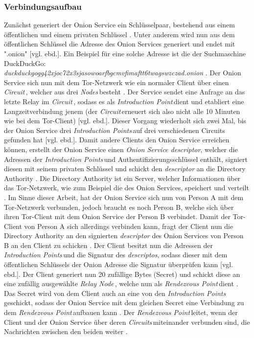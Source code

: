 \documentclass[a4paper,ngerman, headheight=28pt,12pt]{scrartcl}
\newcommand{\vcite}[1]{\cite[vgl.][]{#1}}
\newcommand{\vebd}{[vgl. ebd.]}
\newcommand{\relayn}{\textit{Relay Node\,}}
\newcommand{\nodes}{\textit{Nodes\,}}
\newcommand{\circuit}{\textit{Circuit\,}}
\newcommand{\circuits}{\textit{Circuits\,}}
\newcommand{\introp}{\textit{Introduction Point\,}}
\newcommand{\introps}{\textit{Introduction Points\,}}
\newcommand{\renp}{\textit{Rendezvous Point\,}}
\begin{document}
\subsubsection{Verbindungsaufbau}
Zunächst generiert der Onion Service ein Schlüsselpaar, bestehend aus einem öffentlichen und einem privaten Schlüssel \vcite{GeeksOnionService}. Unter anderem wird nun aus dem öffentlichen Schlüssel die Adresse des Onion Services generiert und endet mit ".onion" \vebd. Ein Beispiel für eine solche Adresse ist die der Suchmaschine DuckDuckGo: \\
\textit{duckduckgogg42xjoc72x3sjasowoarfbgcmvfimaftt6twagswzczad.onion} \vcite{DuckDuckGoLink}.
Der Onion Service sich nun mit dem Tor-Netzwerk wie ein normaler Client über einen \circuit, welcher aus drei \nodes besteht \vcite{TorOnionService}. Der Service sendet eine Anfrage an das letzte Relay im \circuit, sodass es als \introp dient und etabliert eine Langzeitverbindung jenem (der \circuit erneuert sich also nicht alle 10 Minuten wie bei dem Tor-Client) \vebd. Dieser Vorgang wiederholt sich zwei Mal, bis der Onion Service drei \introps auf drei verschiedenen Circuits gefunden hat \vebd. Damit andere Clients den Onion Service erreichen können, erstellt der Onion Service einen \textit{Onion Service descriptor}, welcher die Adressen der \introps und Authentifizierungsschlüssel enthält, signiert diesen mit seinem privaten Schlüssel und schickt den \textit{descriptor} an die Directory Authority \vcite{TorSpecDerivingKeys, TorSpecDirectoryInf}. Die Directory Authority ist ein Server, welcher Informationen über das Tor-Netzwerk, wie zum Beispiel die des Onion Services, speichert und verteilt \vcite{TorDirectoryAuthority}. Im Sinne dieser Arbeit, hat der Onion Service sich nun von Person A mit dem Tor-Netzwerk verbunden, jedoch braucht es noch Person B, welche sich über ihren Tor-Client mit dem Onion Service der Person B verbindet. Damit der Tor-Client von Person A sich allerdings verbinden kann, fragt der Client nun die Directory Authority an den signierten \textit{descriptor} des Onion Services von Person B an den Client zu schicken \vcite{TorStructure}. Der Client besitzt nun die Adressen der \introps und die Signatur des \textit{descriptos}, sodass dieser mit dem öffentlichen Schlüssels der Onion Adresse die Signatur überprüfen kann \vebd. Der Client generiert nun 20 zufällige Bytes (Secret) und schickt diese an eine zufällig ausgewählte \relayn, welche nun als \renp dient \vcite{TorSpecRendezvous}. Das Secret wird von dem Client auch an eine von den \introps geschickt, sodass der Onion Service mit dem gleichen Secret eine Verbindung zu dem \renp aufbauen kann \vcite{TorSpecIntroP}. Der \renp leitet, wenn der Client und der Onion Service über deren \circuits miteinander verbunden sind, die Nachrichten zwischen den beiden weiter \vcite{TorSpecRendezvous}.
\end{document}
